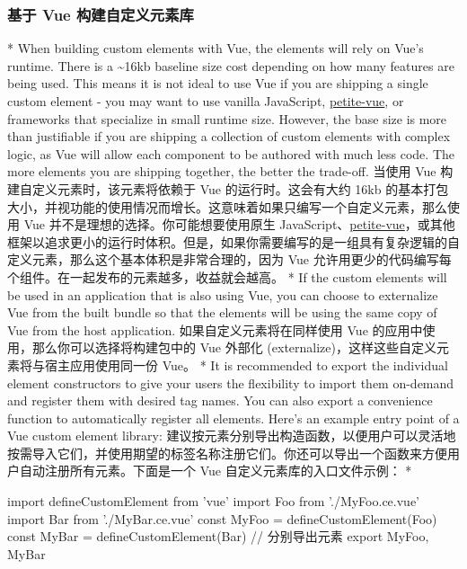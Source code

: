 \begin{paracol}{2}
\subsubsection{基于 Vue 构建自定义元素库}
\switchcolumn[0]*%
When building custom elements with Vue, the elements will rely on Vue's
runtime. There is a \textasciitilde16kb baseline size cost depending on
how many features are being used. This means it is not ideal to use Vue
if you are shipping a single custom element - you may want to use
vanilla JavaScript,
\href{https://github.com/vuejs/petite-vue}{petite-vue}, or frameworks
that specialize in small runtime size. However, the base size is more
than justifiable if you are shipping a collection of custom elements
with complex logic, as Vue will allow each component to be authored with
much less code. The more elements you are shipping together, the better
the trade-off.
\switchcolumn
当使用 Vue 构建自定义元素时，该元素将依赖于 Vue 的运行时。这会有大约
16kb
的基本打包大小，并视功能的使用情况而增长。这意味着如果只编写一个自定义元素，那么使用
Vue 并不是理想的选择。你可能想要使用原生
JavaScript、\href{https://github.com/vuejs/petite-vue}{petite-vue}，或其他框架以追求更小的运行时体积。但是，如果你需要编写的是一组具有复杂逻辑的自定义元素，那么这个基本体积是非常合理的，因为
Vue 允许用更少的代码编写每个组件。在一起发布的元素越多，收益就会越高。
\switchcolumn[0]*%
If the custom elements will be used in an application that is also using
Vue, you can choose to externalize Vue from the built bundle so that the
elements will be using the same copy of Vue from the host application.
\switchcolumn
如果自定义元素将在同样使用 Vue 的应用中使用，那么你可以选择将构建包中的
Vue 外部化 (externalize)，这样这些自定义元素将与宿主应用使用同一份 Vue。
\switchcolumn[0]*%
It is recommended to export the individual element constructors to give
your users the flexibility to import them on-demand and register them
with desired tag names. You can also export a convenience function to
automatically register all elements. Here's an example entry point of a
Vue custom element library:
\switchcolumn
建议按元素分别导出构造函数，以便用户可以灵活地按需导入它们，并使用期望的标签名称注册它们。你还可以导出一个函数来方便用户自动注册所有元素。下面是一个
Vue 自定义元素库的入口文件示例：
\switchcolumn[0]*%
\begin{codeJs}
import { defineCustomElement } from 'vue'
import Foo from './MyFoo.ce.vue'
import Bar from './MyBar.ce.vue'
const MyFoo = defineCustomElement(Foo)
const MyBar = defineCustomElement(Bar)
// 分别导出元素
export { MyFoo, MyBar }

\end{codeJs}
\end{paracol}
